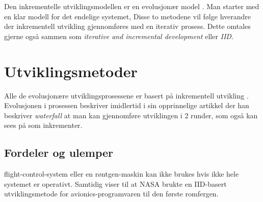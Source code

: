 Den inkrementelle utviklingsmodellen er en evolusjonær model \cite{wiki:incremental_build_model}. Man starter med en klar modell for det endelige systemet, 
Disse to metodene vil følge hverandre der inkrementell utvikling gjennomføres med en iterativ prosess.
Dette omtales gjerne også sammen som \textit{iterative and incremental development} eller \textit{IID}.

\section{Utviklingsmetoder}
Alle de evolusjonære utviklingsprosessene er basert på inkrementell utvikling \cite{larman2003iterative}. Evolusjonen i prosessen 
\textcite{royce1970software} beskriver imidlertid i sin opprinnelige artikkel der han beskriver \textit{waterfall} at man kan 
gjennomføre utviklingen i 2 runder, som også kan sees på som inkrementer.

\subsection{Fordeler og ulemper}
flight-control-system eller en røntgen-maskin kan ikke brukes hvis ikke hele systemet er operativt. Samtidig viser
\textcite{larman2003iterative} til at NASA brukte en IID-basert utviklingsmetode for avionics-programvaren til den første romfergen.
